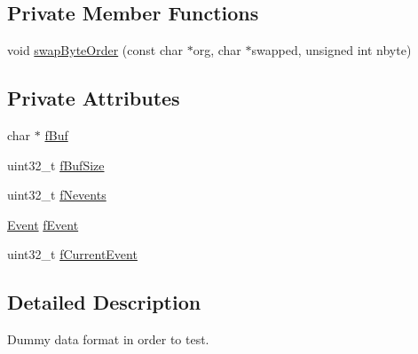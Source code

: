 \subsection*{Private Member Functions}
\begin{DoxyCompactItemize}
\item 
void \hyperlink{class_ph2___hw_interface_1_1_data_a91b7bafc8b47251b022aab16e19fa722}{swap\-Byte\-Order} (const char $\ast$org, char $\ast$swapped, unsigned int nbyte)
\end{DoxyCompactItemize}
\subsection*{Private Attributes}
\begin{DoxyCompactItemize}
\item 
char $\ast$ \hyperlink{class_ph2___hw_interface_1_1_data_acf647e64b2febe8555e7b044e5cfc98d}{f\-Buf}
\item 
uint32\-\_\-t \hyperlink{class_ph2___hw_interface_1_1_data_aaf97e7ef5081a4a6a412c25382b3bafe}{f\-Buf\-Size}
\item 
uint32\-\_\-t \hyperlink{class_ph2___hw_interface_1_1_data_ac27abb30ceb327ce0fc4245caaf0b3d5}{f\-Nevents}
\item 
\hyperlink{class_ph2___hw_interface_1_1_event}{Event} \hyperlink{class_ph2___hw_interface_1_1_data_a1b13d9197eeb9fd673a42a35b55e8dd8}{f\-Event}
\item 
uint32\-\_\-t \hyperlink{class_ph2___hw_interface_1_1_data_a4566e332acab8fe25be41f05c2862222}{f\-Current\-Event}
\end{DoxyCompactItemize}


\subsection{Detailed Description}
Dummy data format in order to test. 

